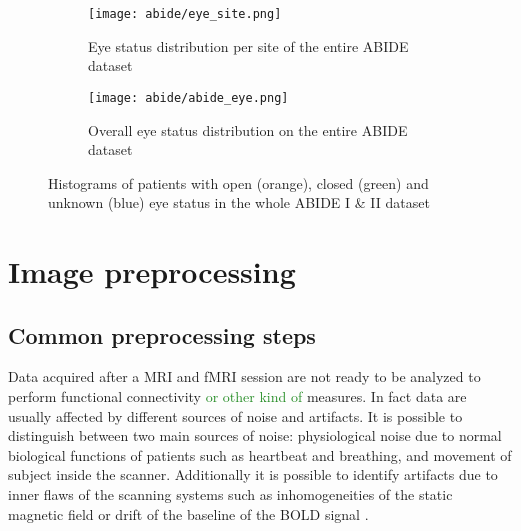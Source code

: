 \documentclass[11pt]{report}
\begin{document}
\begin{figure}
\centering
\begin{subfigure}{0.7\linewidth}
\texttt{[image: abide/eye\_site.png]}
\caption{Eye status distribution per site of the entire ABIDE dataset}
\label{fig:abideeyesite}
\end{subfigure}
\begin{subfigure}{0.4\linewidth}
\texttt{[image: abide/abide\_eye.png]}
\caption{Overall eye status distribution on the entire ABIDE dataset}
\label{fig:abideeye}
\end{subfigure}
\caption{Histograms of patients with open (orange), closed (green) and unknown (blue) eye status in the whole ABIDE I \& II dataset}
 
\end{figure}



\chapter{Image preprocessing}\label{chap:image_preprocessing}
\section{Common preprocessing steps}
\label{sec:preprocessing_steps}

Data acquired after a MRI and fMRI session are not ready to be analyzed to perform functional connectivity \textcolor{ForestGreen}{or other kind of} measures.
In fact data are usually affected by different sources of noise and artifacts.
It is possible to distinguish between two main sources of noise: physiological noise due to normal biological functions of patients such as heartbeat and breathing, and movement of subject inside the scanner.
Additionally it is possible to identify artifacts due to inner flaws of the scanning systems such as inhomogeneities of the static magnetic field or drift of the baseline of the BOLD signal \cite{bijsterbosch2017}.



\end{document}
